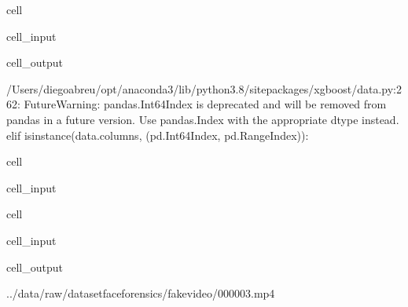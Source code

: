 \documentclass[letterpaper,10pt,brazil]{sphinxmanual}
\begin{document}
\begin{sphinxuseclass}{cell}
\begin{sphinxuseclass}{cell_input}
\end{sphinxuseclass}
\begin{sphinxuseclass}{cell_output}
\begin{sphinxVerbatim}[commandchars=\\\{\}]
/Users/diegoabreu/opt/anaconda3/lib/python3.8/site\PYGZhy{}packages/xgboost/data.py:262: FutureWarning: pandas.Int64Index is deprecated and will be removed from pandas in a future version. Use pandas.Index with the appropriate dtype instead.
  elif isinstance(data.columns, (pd.Int64Index, pd.RangeIndex)):
\end{sphinxVerbatim}

\end{sphinxuseclass}
\end{sphinxuseclass}
\begin{sphinxuseclass}{cell}
\begin{sphinxuseclass}{cell_input}
\begin{sphinxVerbatim}[commandchars=\\\{\}]
   
 
\end{sphinxVerbatim}

\end{sphinxuseclass}
\end{sphinxuseclass}
\begin{sphinxuseclass}{cell}
\begin{sphinxuseclass}{cell_input}
\begin{sphinxVerbatim}[commandchars=\\\{\}]
  
\PYG{p}{[}\PYG{p}{]}
\end{sphinxVerbatim}

\end{sphinxuseclass}
\begin{sphinxuseclass}{cell_output}
\begin{sphinxVerbatim}[commandchars=\\\{\}]
\PYGZsq{}../data/raw/dataset\PYGZus{}faceforensics/fake\PYGZus{}video/000\PYGZus{}003.mp4\PYGZsq{}
\end{sphinxVerbatim}

\end{sphinxuseclass}
\end{sphinxuseclass}
\end{document}
